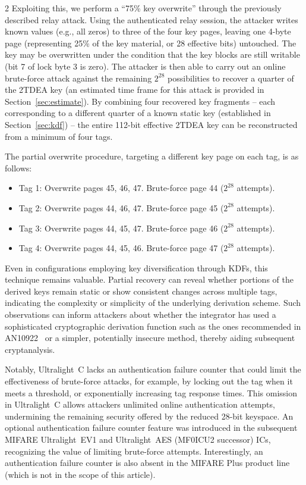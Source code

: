 \documentclass[10pt,letterpaper]{article}
\begin{document}
\begin{multicols}{2}
Exploiting this, we perform a ``75\% key overwrite'' through the previously described relay attack. Using the authenticated relay session, the attacker writes known values (e.g., all zeros) to three of the four key pages, leaving one 4-byte page (representing 25\% of the key material, or 28 effective bits) untouched. The key may be overwritten under the condition that the key blocks are still writable (bit 7 of lock byte 3 is zero). The attacker is then able to carry out an online brute-force attack against the remaining $2^{28}$ possibilities to recover a quarter of the 2TDEA key (an estimated time frame for this attack is provided in Section~\ref{sec:estimate}). By combining four recovered key fragments -- each corresponding to a different quarter of a known static key (established in Section~\ref{sec:kdf}) -- the entire 112-bit effective 2TDEA key can be reconstructed from a minimum of four tags.

\vspace{2mm}
The partial overwrite procedure, targeting a different key page on each tag, is as follows:
\begin{itemize}
    \item Tag 1: Overwrite pages 45, 46, 47. Brute-force page 44 ($2^{28}$ attempts).
    \item Tag 2: Overwrite pages 44, 46, 47. Brute-force page 45 ($2^{28}$ attempts).
    \item Tag 3: Overwrite pages 44, 45, 47. Brute-force page 46 ($2^{28}$ attempts).
    \item Tag 4: Overwrite pages 44, 45, 46. Brute-force page 47 ($2^{28}$ attempts).
\end{itemize}
\vspace{2mm}

Even in configurations employing key diversification through KDFs, this technique remains valuable. Partial recovery can reveal whether portions of the derived keys remain static or show consistent changes across multiple tags, indicating the complexity or simplicity of the underlying derivation scheme. Such observations can inform attackers about whether the integrator has used a sophisticated cryptographic derivation function such as the ones recommended in AN10922~\cite{nxp_an10922} or a simpler, potentially insecure method, thereby aiding subsequent cryptanalysis.

Notably, Ultralight~C lacks an authentication failure counter that could limit the effectiveness of brute-force attacks, for example, by locking out the tag when it meets a threshold, or exponentially increasing tag response times. This omission in Ultralight~C allows attackers unlimited online authentication attempts, undermining the remaining security offered by the reduced 28-bit keyspace. An optional authentication failure counter feature was introduced in the subsequent MIFARE Ultralight~EV1 and Ultralight~AES (MF0ICU2 successor) ICs, recognizing the value of limiting brute-force attempts. Interestingly, an authentication failure counter is also absent in the MIFARE Plus product line (which is not in the scope of this article).


\end{multicols}
\end{document}
